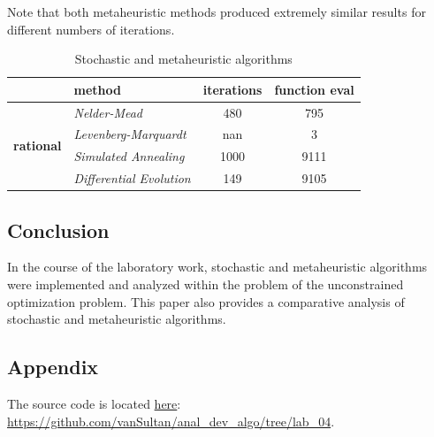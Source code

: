 Note that both metaheuristic methods produced extremely similar results for different numbers of iterations.

\begin{table}[ht]
\caption{Stochastic and metaheuristic algorithms}
\begin{tabular}{l|l|c|c|}
\cline{2-4}
                                                         & \textbf{method}                 & \multicolumn{1}{l|}{\textbf{iterations}} & \multicolumn{1}{l|}{\textbf{function eval}} \\ \hline
\multicolumn{1}{|l|}{\multirow{4}{*}{\textbf{rational}}} & \textit{Nelder-Mead}            & 480                                      & 795                                         \\ \cline{2-4}
\multicolumn{1}{|l|}{}                                   & \textit{Levenberg-Marquardt}    & nan                                      & 3                                           \\ \cline{2-4}
\multicolumn{1}{|l|}{}                                   & \textit{Simulated Annealing}    & 1000                                     & 9111                                        \\ \cline{2-4}
\multicolumn{1}{|l|}{}                                   & \textit{Differential Evolution} & 149                                      & 9105                                        \\ \hline
\end{tabular}
\label{tbl:stohmeta}
\end{table}

\subsection{Conclusion}\label{subsec:conclusion}

In the course of the laboratory work, stochastic and metaheuristic algorithms were implemented and analyzed within the problem of the unconstrained optimization problem.
This paper also provides a comparative analysis of stochastic and metaheuristic algorithms.

\subsection{Appendix}\label{subsec:appendix}

The source code is located \href{https://github.com/vanSultan/anal_dev_algo/tree/lab_04}{here}: \url{https://github.com/vanSultan/anal_dev_algo/tree/lab_04}.
